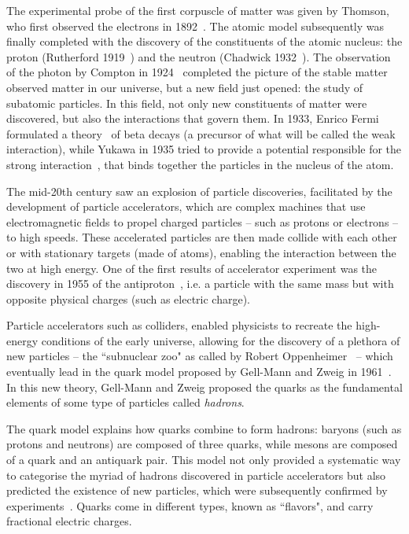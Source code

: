 The experimental probe of the first corpuscle of matter was given by Thomson, who first observed the electrons in 1892~\cite{doi:10.1080/14786449708621070}. The atomic model subsequently was finally completed with the discovery of the constituents of the atomic nucleus: the proton (Rutherford 1919~\cite{doi:10.1080/14786440608635919}) and the neutron (Chadwick 1932~\cite{Chadwick:1932ma}). The observation of the photon by Compton in 1924~\cite{PhysRev.21.483, PhysRev.24.591} completed the picture of the stable matter observed matter in our universe, but a new field just opened: the study of subatomic particles. In this field, not only new constituents of matter were discovered, but also the interactions that govern them. In 1933, Enrico Fermi formulated a theory~\cite{Fermi:1934hr} of beta decays (a precursor of what will be called the weak interaction), while Yukawa in 1935 tried to provide a potential responsible for the strong interaction~\cite{Yukawa:1935xg}, that binds together the particles in the nucleus of the atom. 

The mid-20th century saw an explosion of particle discoveries, facilitated by the development of particle accelerators, which are complex machines that use electromagnetic fields to propel charged particles -- such as protons or electrons -- to high speeds. These accelerated particles are then made collide with each other or with stationary targets (made of atoms), enabling the interaction between the two at high energy. One of the first results of accelerator experiment was the discovery in 1955 of the antiproton~\cite{PhysRev.100.947}, i.e. a particle with the same mass but with opposite physical charges (such as electric charge). 

Particle accelerators such as colliders, enabled physicists to recreate the high-energy conditions of the early universe, allowing for the discovery of a plethora of new particles -- the ``subnuclear zoo" as called by Robert Oppenheimer~\cite{johnson2010strange} -- which eventually lead in the quark model proposed by Gell-Mann and Zweig in 1961~\cite{Gell-Mann:1961omu}. In this new theory,  Gell-Mann and Zweig proposed the quarks as the fundamental elements of some type of particles called \textit{hadrons}. 

The quark model explains how quarks combine to form hadrons: baryons (such as protons and neutrons) are composed of three quarks, while mesons are composed of a quark and an antiquark pair.  This model not only provided a systematic way to categorise the myriad of hadrons discovered in particle accelerators but also predicted the existence of new particles, which were subsequently confirmed by experiments~\cite{PhysRevLett.12.204}. Quarks come in different types, known as ``flavors", and carry fractional electric charges. 

